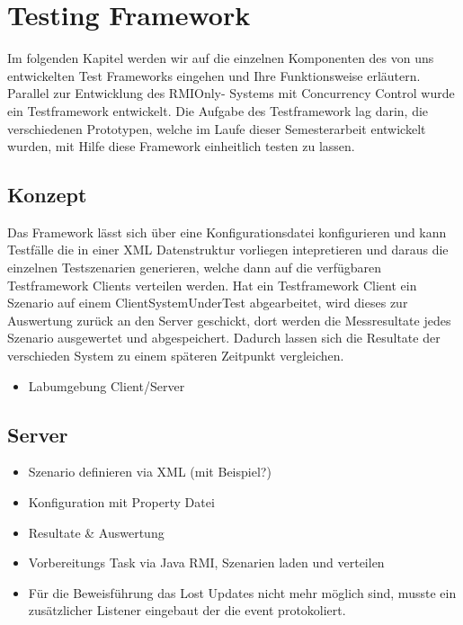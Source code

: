 \section{Testing Framework}
\label{sec:testing Framework}
Im folgenden Kapitel werden wir auf die einzelnen Komponenten des von uns entwickelten Test Frameworks eingehen und Ihre Funktionsweise erläutern. Parallel zur Entwicklung des RMIOnly- Systems mit Concurrency Control wurde ein Testframework entwickelt. Die Aufgabe des Testframework lag darin, die verschiedenen Prototypen, welche im Laufe dieser Semesterarbeit entwickelt wurden, mit Hilfe diese Framework einheitlich testen zu lassen.


\subsection{Konzept}
Das Framework lässt sich über eine Konfigurationsdatei konfigurieren und kann Testfälle die in einer XML Datenstruktur vorliegen intepretieren und daraus die einzelnen Testszenarien generieren, welche dann auf die verfügbaren Testframework Clients verteilen werden. Hat ein Testframework Client ein Szenario auf einem ClientSystemUnderTest abgearbeitet, wird dieses zur Auswertung zurück an den Server geschickt, dort werden die Messresultate jedes Szenario ausgewertet und abgespeichert. Dadurch lassen sich die Resultate der verschieden System zu einem späteren Zeitpunkt vergleichen.

\begin{itemize}
\item Labumgebung \/ Client/Server
\end{itemize}


\subsection{Server}
\label{sec:test-FW Server}
\begin{itemize}
\item Szenario definieren via XML (mit Beispiel?)
\item Konfiguration mit Property Datei
\item Resultate \& Auswertung
\item Vorbereitungs Task via Java RMI, Szenarien laden und verteilen
\item Für die Beweisführung das Lost Updates nicht mehr möglich sind, musste ein zusätzlicher Listener eingebaut der die event protokoliert.
\end{itemize}


